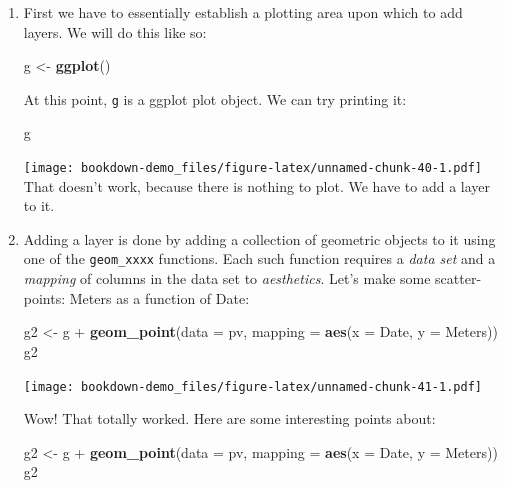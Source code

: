 \documentclass[]{book}
\newenvironment{Shaded}{\begin{snugshade}}{\end{snugshade}}
\newcommand{\KeywordTok}[1]{\textcolor[rgb]{0.13,0.29,0.53}{\textbf{{#1}}}}
\newcommand{\DataTypeTok}[1]{\textcolor[rgb]{0.13,0.29,0.53}{{#1}}}
\newcommand{\StringTok}[1]{\textcolor[rgb]{0.31,0.60,0.02}{{#1}}}
\newcommand{\NormalTok}[1]{{#1}}
\theoremstyle{definition}
\theoremstyle{definition}
\theoremstyle{remark}
\begin{document}
\begin{enumerate}
\def\labelenumi{\arabic{enumi}.}
\item
  First we have to essentially establish a plotting area upon which to
  add layers. We will do this like so:

\begin{Shaded}
\begin{Highlighting}[]
\NormalTok{g <-}\StringTok{ }\KeywordTok{ggplot}\NormalTok{()}
\end{Highlighting}
\end{Shaded}

  At this point, \texttt{g} is a ggplot plot object. We can try printing
  it:

\begin{Shaded}
\begin{Highlighting}[]
\NormalTok{g}
\end{Highlighting}
\end{Shaded}

  \texttt{[image: bookdown-demo\_files/figure-latex/unnamed-chunk-40-1.pdf]}
  That doesn't work, because there is nothing to plot. We have to add a
  layer to it.
\item
  Adding a layer is done by adding a collection of geometric objects to
  it using one of the \texttt{geom\_xxxx} functions. Each such function
  requires a \emph{data set} and a \emph{mapping} of columns in the data
  set to \emph{aesthetics}. Let's make some scatter-points: Meters as a
  function of Date:

\begin{Shaded}
\begin{Highlighting}[]
\NormalTok{g2 <-}\StringTok{ }\NormalTok{g +}\StringTok{ }\KeywordTok{geom_point}\NormalTok{(}\DataTypeTok{data =} \NormalTok{pv, }\DataTypeTok{mapping =} \KeywordTok{aes}\NormalTok{(}\DataTypeTok{x =} \NormalTok{Date, }\DataTypeTok{y =} \NormalTok{Meters))}
\NormalTok{g2}
\end{Highlighting}
\end{Shaded}

  \texttt{[image: bookdown-demo\_files/figure-latex/unnamed-chunk-41-1.pdf]}

  Wow! That totally worked. Here are some interesting points about:

\begin{Shaded}
\begin{Highlighting}[]
\NormalTok{g2 <-}\StringTok{ }\NormalTok{g +}\StringTok{ }\KeywordTok{geom_point}\NormalTok{(}\DataTypeTok{data =} \NormalTok{pv, }\DataTypeTok{mapping =} \KeywordTok{aes}\NormalTok{(}\DataTypeTok{x =} \NormalTok{Date, }\DataTypeTok{y =} \NormalTok{Meters))}
\NormalTok{g2}
\end{Highlighting}
\end{Shaded}


\end{enumerate}
\end{document}
